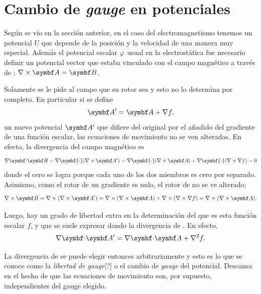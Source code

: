 \documentclass[10pt,oneside]{CBFT_book}
\begin{document}
\section{Cambio de {\it gauge} en potenciales}

Según se vio en la sección anterior, en el caso del electromagnetismo tenemos un potencial $ U $ que depende de la posición y la velocidad
de una manera muy especial. Además el potencial escalar $ \varphi $ usual en la electrostática fue necesario definir un potencial vector 
que estaba vinculado con el campo magnético  a través de : $\rotorm{A}=\vb{B}$.

Solamente se le pide al campo  que su rotor sea  y esto no lo determina por completo. En particular si se define 
\[
	\vb{A}' = \vb{A} + \nabla f,
\]
un nuevo potencial $\vb{A}'$ que difiere del original por el añadido del gradiente de una función escalar, las ecuaciones de movimiento
no se ven alteradas. En efecto, la divergencia del campo magnético  es
\[
	\divem{B} = \nabla \symbf{\cdot} (\rotorm{A}') = 
	\nabla \symbf{\cdot} (\rotorm{A}) + \nabla \symbf{\cdot} (\nabla \times {\nabla f}) = 0
\]
donde el cero se logra porque cada uno de los dos miembros es cero por separado.
Asimismo, como el rotor de un gradiente es nulo, el rotor de  no se ve alterado;
\[
	\rotorm{B} = \nabla \times( \rotorm{A}' ) =
	\nabla \times( \rotorm{A} ) + \nabla \times ( \nabla \times \nabla f ) =
	\nabla \times( \rotorm{A} ).
\]

Luego, hay un grado de libertad extra en la determinación del  que es esta función escalar $f$, y que se suele expresar
dando la divergencia de . En efecto, 
\[
	\divem{A}' = \divem{A} + \nabla^2 f.
\]

La divergencia de  se puede elegir entonces arbitrariamente y esto es lo que se conoce como la {\it libertad de gauge}[?]
o el cambio de {\it gauge} del potencial. Descansa en el hecho de que las ecuaciones de movimiento son, por supuesto, independientes
del gauge elegido.




\end{document}
